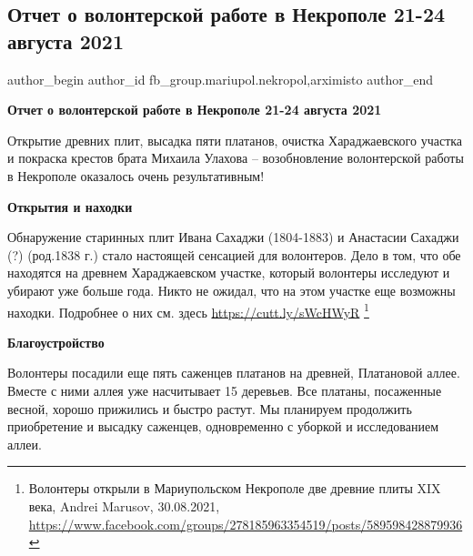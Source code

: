  
 
 
 
 

\subsection{Отчет о волонтерской работе в Некрополе 21-24 августа 2021}
\label{sec:02_09_2021.fb.fb_group.mariupol.nekropol.1.otchet_volonter_rabota_21_24_avgusta}
 
\ifcmt
 author_begin
   author_id fb_group.mariupol.nekropol,arximisto
 author_end
\fi

\vspace{0.5cm}
\textbf{Отчет о волонтерской работе в Некрополе 21-24 августа 2021}

Открытие древних плит, высадка пяти платанов, очистка Хараджаевского участка и
покраска крестов брата Михаила Улахова – возобновление волонтерской работы в
Некрополе оказалось очень результативным!

\textbf{Открытия и находки}

Обнаружение старинных плит Ивана Сахаджи (1804-1883) и Анастасии Сахаджи (?)
(род.1838 г.) стало настоящей сенсацией для волонтеров. Дело в том, что обе
находятся на древнем Хараджаевском участке, который волонтеры исследуют и
убирают уже больше года. Никто не ожидал, что на этом участке еще возможны
находки. Подробнее о них см. здесь \url{https://cutt.ly/sWcHWyR}
\footnote{Волонтеры открыли в Мариупольском Некрополе две древние плиты XIX века, Andrei Marusov, 30.08.2021, \url{https://www.facebook.com/groups/278185963354519/posts/589598428879936}}

\textbf{Благоустройство}

Волонтеры посадили еще пять саженцев платанов на древней, Платановой аллее.
Вместе с ними аллея уже насчитывает 15 деревьев. Все платаны, посаженные
весной, хорошо прижились и быстро растут. Мы планируем продолжить приобретение
и высадку саженцев, одновременно с уборкой и исследованием аллеи.

